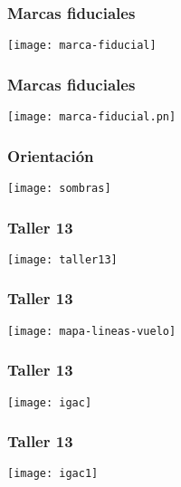 \documentclass[14pt]{beamer}
\begin{document}
\begin{frame}
\frametitle{Marcas fiduciales}
\begin{center}
\texttt{[image: marca-fiducial]}
\end{center}
\end{frame}
\begin{frame}
\frametitle{Marcas fiduciales}
\begin{center}
\texttt{[image: marca-fiducial.pn]}
\end{center}
\end{frame}
\begin{frame}
\frametitle{Orientación}
\begin{center}
\texttt{[image: sombras]}
\end{center}
\end{frame}
\begin{frame}
\frametitle{Taller 13}
\begin{center}
\texttt{[image: taller13]}
\end{center}
\end{frame}
\begin{frame}
\frametitle{Taller 13}
\begin{center}
\texttt{[image: mapa-lineas-vuelo]}
\end{center}
\end{frame}
\begin{frame}
\frametitle{Taller 13}
\begin{center}
\texttt{[image: igac]}
\end{center}
\end{frame}
\begin{frame}
\frametitle{Taller 13}
\begin{center}
\texttt{[image: igac1]}
\end{center}
\end{frame}
\end{document}
